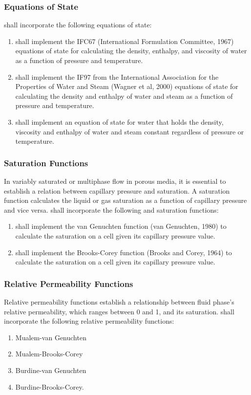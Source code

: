 \subsubsection{Equations of State}
\pft shall incorporate the following equations of state:
\begin{enumerate}
	\item \label{eos_water_ifc67} \pft shall implement the IFC67 (International Formulation Committee, 1967) equations of state for calculating the density, enthalpy, and viscosity of water as a function of pressure and temperature.
	\item \label{eos_water_eos_water_if97} \pft shall implement the IF97 from the International Association for the Properties of Water and Steam (Wagner et al, 2000) equations of state for calculating the density and enthalpy of water and steam as a function of pressure and temperature.
	\item \label{eos_water_constant} \pft shall implement an equation of state for water that holds the density, viscosity and enthalpy of water and steam constant regardless of pressure or temperature.
\end{enumerate}

\subsubsection{Saturation Functions}
In variably saturated or multiphase flow in porous media, it is essential to establish a relation between capillary pressure and saturation.
A saturation  function calculates the liquid or gas saturation as a function of capillary pressure and vice versa. 
\pft shall incorporate the following and saturation functions:
\begin{enumerate}[resume]
	\item \label{vanGen} \pft shall implement the van Genuchten function (van Genuchten, 1980) to calculate the saturation on a cell given its capillary pressure value.
	\item \label{brCorey} \pft shall implement the Brooks-Corey function (Brooks and Corey,  1964) to calculate the saturation on a cell given its capillary pressure value.
\end{enumerate}

\subsubsection{Relative Permeability Functions}
Relative permeability functions establish a relationship between fluid phase's  relative permeability, which ranges between 0 and 1, and its saturation. 
\pft shall incorporate the following relative permeability functions:
\begin{enumerate}[resume]
	\item \label{mualem_vg} Mualem-van Genuchten 
	\item \label{mualem_bc} Mualem-Brooks-Corey 
	\item \label{burdine_vg} Burdine-van Genuchten
	\item \label{burdine_bc} Burdine-Brooks-Corey.
\end{enumerate}

